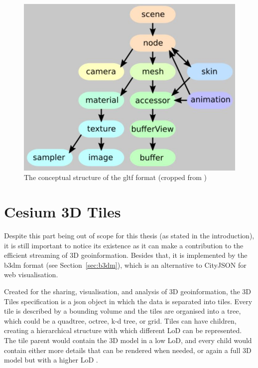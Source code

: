 \begin{figure}[h!]
    \centering
    \includegraphics[scale=0.5]{figs/related_work/gltf.jpg}
    \caption{The conceptual structure of the \ac{gltf} format (cropped from \citet{KhronosGroup2019})}
    \label{fig:gltf}
\end{figure}

\section{Cesium 3D Tiles}
\label{sec:3dtiles}
Despite this part being out of scope for this thesis (as stated in the introduction), it is still important to notice its existence as it can make a contribution to the efficient streaming of 3D geoinformation.
Besides that, it is implemented by the \ac{b3dm} format (see Section~\ref{sec:b3dm}), which is an alternative to CityJSON for web visualisation.

Created for the sharing, visualisation, and analysis of 3D geoinformation, the 3D Tiles specification \citep{3dtiles} is a \ac{json} object in which the data is separated into tiles.
Every tile is described by a bounding volume and the tiles are organised into a tree, which could be a quadtree, octree, k-d tree, or grid.
Tiles can have children, creating a hierarchical structure with which different LoD can be represented.
The tile parent would contain the 3D model in a low LoD, and every child would contain either more details that can be rendered when needed, or again a full 3D model but with a higher LoD \citep{Cesium2020}.

